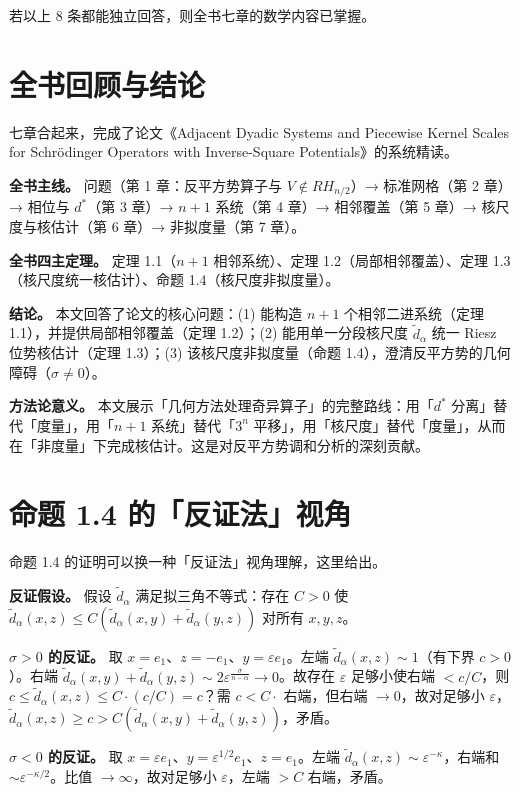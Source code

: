 \documentclass[a4paper,11pt,openany]{ctexbook}
\numberwithin{equation}{chapter}
\numberwithin{figure}{chapter}
\numberwithin{table}{chapter}
\begin{document}
若以上 8 条都能独立回答，则全书七章的数学内容已掌握。

\section{全书回顾与结论}

七章合起来，完成了论文《Adjacent Dyadic Systems and Piecewise Kernel Scales for Schrödinger Operators with Inverse-Square Potentials》的系统精读。

\textbf{全书主线。} 问题（第 1 章：反平方势算子与 $V\notin RH_{n/2}$）→ 标准网格（第 2 章）→ 相位与 $d^*$（第 3 章）→ $n+1$ 系统（第 4 章）→ 相邻覆盖（第 5 章）→ 核尺度与核估计（第 6 章）→ 非拟度量（第 7 章）。

\textbf{全书四主定理。} 定理 1.1（$n+1$ 相邻系统）、定理 1.2（局部相邻覆盖）、定理 1.3（核尺度统一核估计）、命题 1.4（核尺度非拟度量）。

\textbf{结论。} 本文回答了论文的核心问题：(1) 能构造 $n+1$ 个相邻二进系统（定理 1.1），并提供局部相邻覆盖（定理 1.2）；(2) 能用单一分段核尺度 $\widetilde d_\alpha$ 统一 Riesz 位势核估计（定理 1.3）；(3) 该核尺度非拟度量（命题 1.4），澄清反平方势的几何障碍（$\sigma\neq0$）。

\textbf{方法论意义。} 本文展示「几何方法处理奇异算子」的完整路线：用「$d^*$ 分离」替代「度量」，用「$n+1$ 系统」替代「$3^n$ 平移」，用「核尺度」替代「度量」，从而在「非度量」下完成核估计。这是对反平方势调和分析的深刻贡献。

\section{命题 1.4 的「反证法」视角}

命题 1.4 的证明可以换一种「反证法」视角理解，这里给出。

\textbf{反证假设。} 假设 $\widetilde d_\alpha$ 满足拟三角不等式：存在 $C>0$ 使 $\widetilde d_\alpha(x,z)\le C(\widetilde d_\alpha(x,y)+\widetilde d_\alpha(y,z))$ 对所有 $x,y,z$。

\textbf{$\sigma>0$ 的反证。} 取 $x=e_1$、$z=-e_1$、$y=\varepsilon e_1$。左端 $\widetilde d_\alpha(x,z)\sim1$（有下界 $c>0$）。右端 $\widetilde d_\alpha(x,y)+\widetilde d_\alpha(y,z)\sim2\varepsilon^{\frac{\sigma}{n-\alpha}}\to0$。故存在 $\varepsilon$ 足够小使右端 $<c/C$，则 $c\le\widetilde d_\alpha(x,z)\le C\cdot(c/C)=c$？需 $c<C\cdot$ 右端，但右端 $\to0$，故对足够小 $\varepsilon$，$\widetilde d_\alpha(x,z)\ge c> C(\widetilde d_\alpha(x,y)+\widetilde d_\alpha(y,z))$，矛盾。

\textbf{$\sigma<0$ 的反证。} 取 $x=\varepsilon e_1$、$y=\varepsilon^{1/2}e_1$、$z=e_1$。左端 $\widetilde d_\alpha(x,z)\sim\varepsilon^{-\kappa}$，右端和 $\sim\varepsilon^{-\kappa/2}$。比值 $\to\infty$，故对足够小 $\varepsilon$，左端 $>C$ 右端，矛盾。
\end{document}
